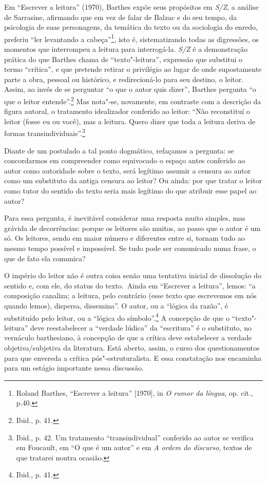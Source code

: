 Em ``Escrever a leitura'' (1970), Barthes expõe seus propósitos em \emph{S/Z},
a análise de Sarrasine, afirmando que em vez de falar de Balzac e do seu
tempo, da psicologia de suas personagens, da temática do texto ou da
sociologia do enredo, preferiu ``ler levantando a cabeça''\footnote{Roland
  Barthes, ``Escrever a leitura'' [1970], in \emph{O rumor da
  língua}, op. cit., p.40.}, isto é, sistematizando todas as digressões,
os momentos que interrompeu a leitura para interrogá-la. \emph{S/Z} é a
demonstração prática do que Barthes chama de ``texto"-leitura'',
expressão que substitui o termo ``crítica'', e que pretende retirar o
privilégio ao lugar de onde supostamente parte a obra, pessoal ou
histórico, e redirecioná-lo para seu destino, o leitor. Assim, ao invés
de se perguntar ``o que o autor quis dizer'', Barthes pergunta ``o que o
leitor entende''.\footnote{Ibid., p. 41.} Mas nota"-se, novamente, em
contraste com a descrição da figura autoral, o tratamento idealizador
conferido ao leitor: ``Não reconstituí o leitor (fosse eu ou você), mas
a leitura. Quero dizer que toda a leitura deriva de formas
transindividuais''.\footnote{Ibid., p. 42. Um tratamento
  ``transindividual'' conferido ao autor se verifica em Foucault, em ``O
  que é um autor'' e em \emph{A ordem do discurso}, textos de que
  tratarei noutra ocasião.}

Diante de um postulado a tal ponto dogmático, refaçamos a pergunta: se
concordarmos em compreender como equivocado o espaço antes conferido ao
autor como autoridade sobre o texto, será legítimo assumir a censura ao
autor como um substituto da antiga censura ao leitor? Ou ainda: por que
tratar o leitor como tutor do sentido do texto seria mais legítimo do
que atribuir esse papel ao autor?

Para essa pergunta, é inevitável considerar uma resposta muito simples,
mas grávida de decorrências: porque os leitores são muitos, ao passo que
o autor é um só. Os leitores, sendo em maior número e diferentes entre
si, tornam tudo ao mesmo tempo possível e impossível. Se tudo pode ser
comunicado numa frase, o que de fato ela comunica?

O império do leitor não é outra coisa senão uma tentativa inicial de
dissolução do sentido e, com ele, do status do texto.~Ainda em
``Escrever a leitura'', lemos: ``a composição canaliza; a leitura, pelo
contrário (esse texto que escrevemos em nós quando lemos), dispersa,
dissemina''. O autor, ou a ``lógica da razão'', é substituído pelo
leitor, ou a ``lógica do símbolo''.\footnote{Ibid., p. 41.} A concepção
de que o ``texto"-leitura'' deve reestabelecer a ``verdade lúdica'' da
``escritura'' é o substituto, no vernáculo barthesiano, à concepção de
que a crítica deve estabelecer a verdade objetiva/subjetiva da
literatura. Está aberto, assim, o curso dos questionamentos para que
envereda a crítica pós"-estruturalista. E essa constatação nos encaminha
para um estágio importante nessa discussão.

